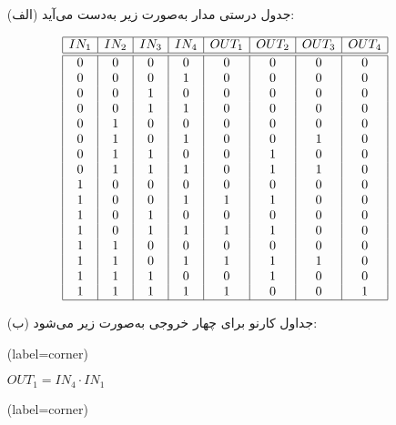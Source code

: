 \begin{enumerate}
	\item [(الف)]
	جدول درستی مدار به‌صورت زیر به‌دست می‌آید:
	
	
	\begin{latin}
		\[
		\begin{array}{|c|c|c|c|c|c|c|c|c|}
			\hline
			IN_1 & IN_2 & IN_3 & IN_4 & OUT_1 & OUT_2 & OUT_3 & OUT_4 \\
			\hline\hline
			0 & 0 & 0 & 0 & 0 & 0 & 0 & 0 \\
			0 & 0 & 0 & 1 & 0 & 0 & 0 & 0 \\
			0 & 0 & 1 & 0 & 0 & 0 & 0 & 0 \\
			0 & 0 & 1 & 1 & 0 & 0 & 0 & 0 \\
			0 & 1 & 0 & 0 & 0 & 0 & 0 & 0 \\
			0 & 1 & 0 & 1 & 0 & 0 & 1 & 0 \\
			0 & 1 & 1 & 0 & 0 & 1 & 0 & 0 \\
			0 & 1 & 1 & 1 & 0 & 1 & 1 & 0 \\
			1 & 0 & 0 & 0 & 0 & 0 & 0 & 0 \\ 
			1 & 0 & 0 & 1 & 1 & 1 & 0 & 0 \\
			1 & 0 & 1 & 0 & 0 & 0 & 0 & 0 \\
			1 & 0 & 1 & 1 & 1 & 1 & 0 & 0 \\
			1 & 1 & 0 & 0 & 0 & 0 & 0 & 0 \\
			1 & 1 & 0 & 1 & 1 & 1 & 1 & 0 \\
			1 & 1 & 1 & 0 & 0 & 1 & 0 & 0 \\
			1 & 1 & 1 & 1 & 1 & 0 & 0 & 1 \\
			\hline
		\end{array}
		\]
	\end{latin}
	
	
	
	
	\item [(ب)]
	جداول کارنو برای چهار خروجی به‌صورت زیر می‌شود:
	
	\begin{latin}
		\begin{minipage}{0.48\textwidth}
			\centering
			\begin{karnaugh-map}[4][4][1][$IN_2$][$IN_1$][$IN_4$][$IN_3$](label=corner)
			\end{karnaugh-map}

			$OUT_1=IN_4 \cdot IN_1$
		\end{minipage}
		\hfill
		\begin{minipage}{0.48\textwidth}
			\centering
			\begin{karnaugh-map}[4][4][1][$IN_2$][$IN_1$][$IN_4$][$IN_3$](label=corner)
				\implicantcorner
			\end{karnaugh-map}


\end{minipage}
\end{latin}
\end{enumerate}
